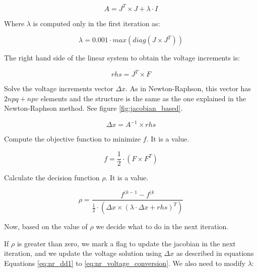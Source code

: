 \documentclass{tufte-book}
\begin{document}
\begin{equation}
A = J^T \times J + \lambda \cdot I
\label{eq:lm_A}
\end{equation}

Where $\lambda$ is computed only in the first iteration as:

\begin{equation}
\lambda = 0.001 \cdot max(diag(J \times J^T))
\end{equation}

The right hand side of the linear system to obtain the voltage increments is:


\begin{equation}
rhs = J^T \times F
\label{eq:lm_rhs}
\end{equation}


Solve the voltage increments vector $\Delta x$. As in Newton-Raphson, this vector has $2npq+npv$ elements and the structure is the same as the one explained in the Newton-Raphson method. See figure \ref{fig:jacobian_based}.

\begin{equation}
\Delta x = A^{-1} \times rhs
\label{eq:lm_solve}
\end{equation}

Compute the objective function to minimize $f$. It is a value.

\begin{equation}
f = \frac{1}{2} \cdot (F \times F^T)
\label{eq:lm_f}
\end{equation}

Calculate the decision function $\rho$. It is a value.


\begin{equation}
\rho = \frac{f^{(k-1}-f^{(k}}{\frac{1}{2} \cdot (\Delta x \times (\lambda \cdot \Delta x + rhs)^T)}
\label{eq:lm_rho}
\end{equation}

Now, based on the value of $\rho$ we decide what to do in the next iteration.

If $\rho$ is greater than zero, we mark a flag to update the jacobian in the next iteration, and we update the voltage solution using $\Delta x$ as described in equations Equations \ref{eq:nr_dd1} to \ref{eq:nr_voltage_conversion}. We also need to modify $\lambda$:
\end{document}
